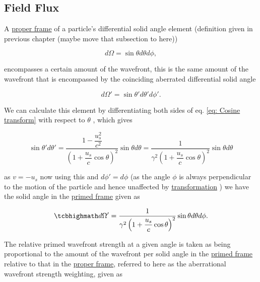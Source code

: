 \subsection{Field Flux}

A \hyperlink{def-proper-frame}{proper frame} of a particle's differential solid angle element (definition given in previous chapter (maybe move that subsection to here))

\begin{equation}
	d\Omega = \sin{\theta} d\theta d\phi,
\end{equation}

encompasses a certain amount of the wavefront, this is the same amount of the wavefront that is encompassed by the coinciding aberrated differential solid angle

\begin{equation}
	d\Omega' = \sin{\theta'} d\theta' d\phi'.
\end{equation}

We can calculate this element by differentiating both sides of eq. \eqref{eq: Cosine transform} with respect to $\theta$ \cite{hogg1997special}, which gives

\begin{equation}
	\sin{\theta'} d\theta' = \dfrac{1-\dfrac{u_s^2}{c^2}}{\left(1+\dfrac{u_s}{c}\cos{\theta}\right)^2} \sin{\theta} d\theta = \dfrac{1}{{\gamma}^2\left(1+\dfrac{u_s}{c}\cos{\theta}\right)^2} \sin{\theta} d\theta
\end{equation}

as $v=-u_s$ now using this and $d\phi'=d\phi$ (as the angle $\phi$ is always perpendicular to the motion of the particle and hence unaffected by \hyperlink{def-transform}{transformation} ) we have the solid angle in the \hyperlink{def-Primed-Frame}{primed frame} given as

\begin{equation}
	\mhl{
		d\Omega' = \dfrac{1}{{\gamma}^2\left(1+\dfrac{u_s}{c}\cos{\theta}\right)^2} \sin{\theta} d\theta d\phi.
	}
\end{equation}

The relative primed wavefront strength at a given angle is taken as being proportional to the amount of the wavefront per solid angle in the \hyperlink{def-Primed-Frame}{primed frame} relative to that in the \hyperlink{def-proper-frame}{proper frame}, referred to here as the aberrational wavefront strength weighting, given as

